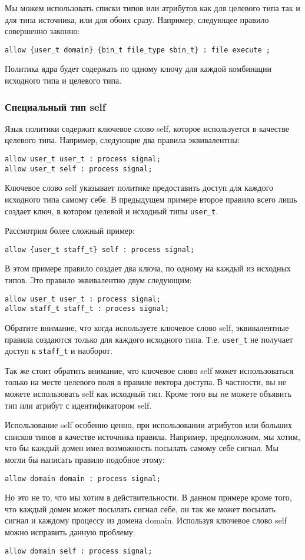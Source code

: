 \documentclass{./../class/UIR}
\begin{document}
    Мы можем использовать списки типов или атрибутов как для целевого типа так и
    для типа источника, или для обоих сразу. Например, следующее правило
    совершенно законно:
\begin{verbatim}
allow {user_t domain} {bin_t file_type sbin_t} : file execute ;
\end{verbatim}
    Политика ядра будет содержать по одному ключу для каждой комбинации
    исходного типа и целевого типа.

\subsubsection{Специальный тип self}

    Язык политики содержит ключевое слово self, которое используется в качестве
    целевого типа. Например, следующие два правила эквивалентны:
\begin{verbatim}
allow user_t user_t : process signal;
allow user_t self : process signal;
\end{verbatim}
    Ключевое слово self указывает политике предоставить доступ для каждого
    исходного типа самому себе. В предыдущем примере второе правило всего лишь
    создает ключ, в котором целевой и исходный типы \verb"user_t".

    Рассмотрим более сложный пример:
\begin{verbatim}
allow {user_t staff_t} self : process signal;
\end{verbatim}
    В этом примере правило создает два ключа, по одному на каждый из исходных
    типов. Это правило эквивалентно двум следующим:
\begin{verbatim}
allow user_t user_t : process signal;
allow staff_t staff_t : process signal;
\end{verbatim}
    Обратите внимание, что когда используете ключевое слово self, эквивалентные
    правила создаются только для каждого исходного типа. Т.е. \verb"user_t" не
    получает доступ к \verb"staff_t" и наоборот.

    Так же стоит обратить внимание, что ключевое слово self может использоваться
    только на месте целевого поля в правиле вектора доступа. В частности, вы не
    можете использовать self как исходный тип.  Кроме того вы не можете объявить
    тип или атрибут с идентификатором self.

    Использование self особенно ценно, при использовании атрибутов или больших
    списков типов в качестве источника правила. Например, предположим, мы хотим,
    что бы каждый домен имел возможность посылать самому себе сигнал. Мы могли
    бы написать правило подобное этому:
\begin{verbatim}
allow domain domain : process signal;
\end{verbatim}
    Но это не то, что мы хотим в действительности. В данном примере кроме того,
    что каждый домен может посылать сигнал себе, он так же может посылать сигнал
    и каждому процессу из домена domain. Используя ключевое слово self можно
    исправить данную проблему:
\begin{verbatim}
allow domain self : process signal;
\end{verbatim}
\end{document}
